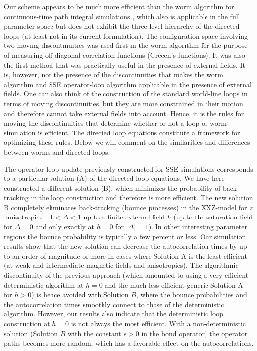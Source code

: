 \documentclass[10pt,pre,aps,twocolumn,showpacs,superscriptaddress,
floatfix]{revtex4}
\begin{document}
Our scheme appears to be much more
efficient than the worm algorithm for continuous-time path integral 
simulations \cite{prokofev}, which also is applicable in the full parameter
space but does not exhibit the three-level hierarchy of the directed loops
(at least not in its current formulation). The
configuration space involving two moving discontinuities was used first in
the worm algorithm for the purpose of measuring off-diagonal correlation
functions (Greeen's functions). It was also the first method that was
practically useful in the presence of external fields. It is, however, not
the presence of the discontinuities that makes the worm algorithm and SSE
operator-loop \cite{sse3} algorithm applicable in the presence of external
fields. One can also think of the construction of the standard world-line
loops \cite{evertz,evertzchapter} in terms of moving discontinuities, but they are more
constrained in their motion and therefore cannot take external fields
into account. Hence, it is the rules for moving the discontinuities
that determine whether or not a loop or worm simulation is efficient.
The directed loop equations constitute a framework for optimizing
these rules. Below we will comment on the similarities and differences between worms and directed loops.

The operator-loop update previously constructed for SSE simulations \cite{sse3}
corresponds to a particular solution (A) of the directed loop equations.
We have here constructed a different solution 
(B), which minimizes the probability of back tracking in the loop construction
and therefore is more efficient. The new solution B completely eliminates 
back-tracking (bounce processes) in the XXZ-model for $z$-anisotropies 
$-1 < \Delta < 1$ up to a finite external field $h$ (up to the saturation 
field for $\Delta=0$ and only exactly at $h=0$ for $|\Delta| =1$). 
In other interesting parameter regions the bounce probability is typically
a few percent or less. Our simulation results show that the new solution can 
decrease the autocorrelation times by up to an order of magnitude or more 
in cases where Solution A is the least efficient (at weak and
intermediate magnetic fields and anisotropies). The algorithmic discontinuity 
of the previous approach (which amounted to using a very efficient 
deterministic algorithm at $h=0$ and the much less efficient generic 
Solution A for $h > 0$) is hence avoided with Solution $B$, where the bounce 
probabilities and the autocorrelation times smoothly connect to those of the 
deterministic algorithm. However, our results also indicate that the 
deterministic loop construction at $h=0$ is not always the most efficient. 
With a non-deterministic solution (Solution $B$ with the constant $\epsilon 
> 0$ in the bond operator) the operator paths becomes more random, which has a 
favorable effect on the autocorrelations.
\end{document}
